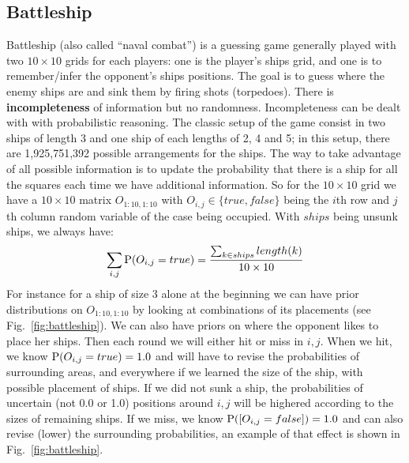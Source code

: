 \subsection{Battleship}
Battleship (also called ``naval combat'') is a guessing game generally played with two $10\times10$ grids for each players: one is the player's ships grid, and one is to remember/infer the opponent's ships positions. The goal is to guess where the enemy ships are and sink them by firing shots (torpedoes). There is \textbf{incompleteness} of information but no randomness. Incompleteness can be dealt with with probabilistic reasoning. The classic setup of the game consist in two ships of length 3 and one ship of each lengths of 2, 4 and 5; in this setup, there are 1,925,751,392 possible arrangements for the ships. The way to take advantage of all possible information is to update the probability that there is a ship for all the squares each time we have additional information. So for the $10\times10$ grid we have a $10\times10$ matrix $O_{1:10,1:10}$ with $O_{i,j} \in \{true,false\}$ being the $i$th row and $j$th column random variable of the case being occupied. With $ships$ being unsunk ships, we always have: $$\sum_{i,j}\mathrm{P}(O_{i,j}=true) = \frac{\sum_{k\in ships}length(k)}{10 \times 10}$$ For instance for a ship of size 3 alone at the beginning we can have prior distributions on $O_{1:10,1:10}$ by looking at combinations of its placements (see Fig.~\ref{fig:battleship}). We can also have priors on where the opponent likes to place her ships. Then each round we will either hit or miss in $i,j$. When we hit, we know $\mathrm{P}(O_{i,j}=true)=1.0$ and will have to revise the probabilities of surrounding areas, and everywhere if we learned the size of the ship, with possible placement of ships. If we did not sunk a ship, the probabilities of uncertain (not 0.0 or 1.0) positions around $i,j$ will be highered according to the sizes of remaining ships. If we miss, we know $\mathrm{P}([O_{i,j}=false])=1.0$ and can also revise (lower) the surrounding probabilities, an example of that effect is shown in Fig.~\ref{fig:battleship}. 

